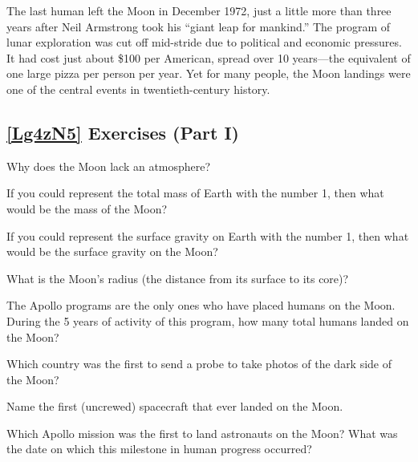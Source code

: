 \documentclass{article}
\numberwithin{equation}{section}
\numberwithin{figure}{section}
\begin{document}
The last human left the Moon in December 1972, just a little more than three years after Neil Armstrong took his ``giant leap for mankind.'' The program of lunar exploration was cut off mid-stride due to political and economic pressures. It had cost just about \$100 per American, spread over 10 years---the equivalent of one large pizza per person per year. Yet for many people, the Moon landings were one of the central events in twentieth-century history.


\subsection*{\ref{Lg4zN5} Exercises (Part I)}

\begin{exercise}
Why does the Moon lack an atmosphere?
\end{exercise}

\begin{exercise}
    If you could represent the total mass of Earth with the number 1, then what would be the mass of the Moon?
\end{exercise}

\begin{exercise}
    If you could represent the surface gravity on Earth with the number 1, then what would be the surface gravity on the Moon?
\end{exercise}

\begin{exercise}
    What is the Moon's radius (the distance from its surface to its core)?
\end{exercise}

\begin{exercise}
    The Apollo programs are the only ones who have placed humans on the Moon. During the 5 years of activity of this program, how many total humans landed on the Moon?
\end{exercise}

\begin{exercise}
    Which country was the first to send a probe to take photos of the dark side of the Moon?
\end{exercise}

\begin{exercise}
    Name the first (uncrewed) spacecraft that ever landed on the Moon.
\end{exercise}

\begin{exercise}
    Which Apollo mission was the first to land astronauts on the Moon? What was the date on which this milestone in human progress occurred?
\end{exercise}
\end{document}
